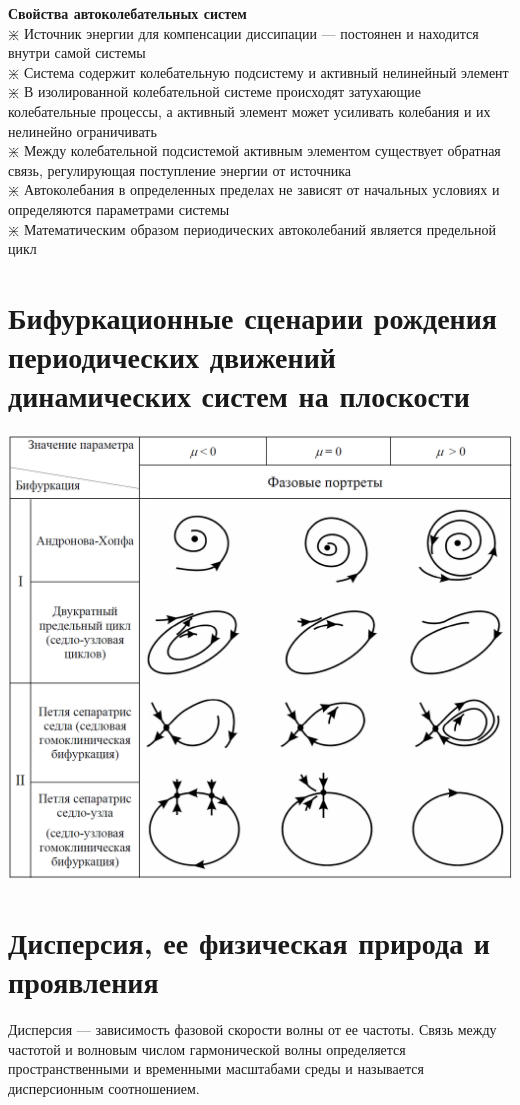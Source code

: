 \begin{multicols*}{2}
		\textbf{Свойства автоколебательных систем}\\
		$\divideontimes$ Источник энергии для компенсации диссипации — постоянен и находится внутри самой системы\\
		$\divideontimes$ Система содержит колебательную подсистему и активный нелинейный элемент\\
		$\divideontimes$ В изолированной колебательной системе происходят затухающие колебательные процессы, а активный элемент может усиливать колебания и их нелинейно ограничивать\\
		$\divideontimes$ Между колебательной подсистемой активным элементом существует обратная связь, регулирующая поступление энергии от источника\\
		$\divideontimes$ Автоколебания в определенных пределах не зависят от начальных условиях и определяются параметрами системы\\
		$\divideontimes$ Математическим образом периодических автоколебаний является предельной цикл
		
		\section{Бифуркационные сценарии рождения периодических движений динамических систем на плоскости}
		\includegraphics[width=0.65\linewidth]{tk_img/bifurk.png}
		
		\section{Дисперсия, ее физическая природа и проявления}
		Дисперсия — зависимость фазовой скорости волны от ее частоты. Связь между частотой и волновым числом гармонической волны определяется пространственными и временными масштабами среды и называется дисперсионным соотношением.
		

\end{multicols*}
